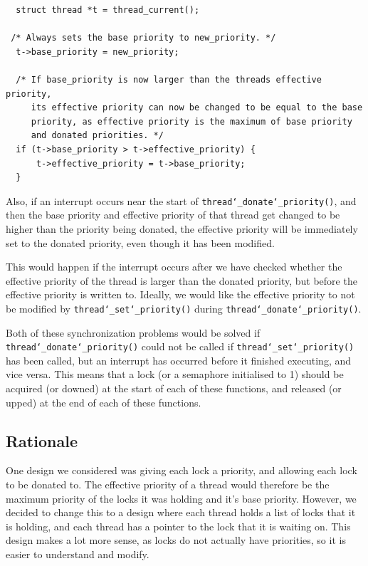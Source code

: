 \documentclass{article}
\renewcommand{\_}{\char`_}
\begin{document}
\begin{lstlisting}
  struct thread *t = thread_current();

 /* Always sets the base priority to new_priority. */
  t->base_priority = new_priority;

  /* If base_priority is now larger than the threads effective priority,
     its effective priority can now be changed to be equal to the base
     priority, as effective priority is the maximum of base priority
     and donated priorities. */
  if (t->base_priority > t->effective_priority) {
	  t->effective_priority = t->base_priority;
  }
\end{lstlisting}

Also, if an interrupt occurs near the start of \texttt{thread\_donate\_priority()}, and then the base priority and effective priority of that thread get changed to be higher than the priority being donated, the effective priority will be immediately set to the donated priority, even though it has been modified.

This would happen if the interrupt occurs after we have checked whether the effective priority of the thread is larger than the donated priority, but before the effective priority is written to. Ideally, we would like the effective priority to not be modified by \texttt{thread\_set\_priority()} during \texttt{thread\_donate\_priority()}.

Both of these synchronization problems would be solved if \texttt{thread\_donate\_priority()} could not be called if \texttt{thread\_set\_priority()} has been called, but an interrupt has occurred before it finished executing, and vice versa. This means that a lock (or a semaphore initialised to 1) should be acquired (or downed) at the start of each of these functions, and released (or upped) at the end of each of these functions.

\subsection{Rationale}

One design we considered was giving each lock a priority, and allowing each lock to be donated to. The effective priority of a thread would therefore be the maximum priority of the locks it was holding and it's base priority. However, we decided to change this to a design where each thread holds a list of locks that it is holding, and each thread has a pointer to the lock that it is waiting on. This design makes a lot more sense, as locks do not actually have priorities, so it is easier to understand and modify. 
\end{document}
